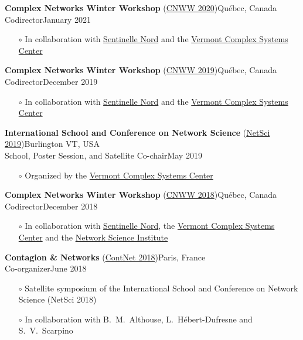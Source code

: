 \documentclass[11pt]{article}
\begin{document}
%
\parbox{\textwidth}{%
\textbf{Complex Networks Winter Workshop} (\href{https://sentinellenord.ulaval.ca/en/formation/ecoles-doctorales-internationales/ecole-internationale-sur-les-reseaux-complexes}{CNWW 2020})\hfill Qu\'ebec, Canada\\
Codirector\hfill January 2021
\begin{itemize}[leftmargin=1.5em]\small
  \item[$\circ$] In collaboration with \href{http://sentinellenord.ulaval.ca/}{Sentinelle Nord} and the \href{https://vermontcomplexsystems.org/}{Vermont Complex Systems Center}
\end{itemize}}
%
\parbox{\textwidth}{%
\textbf{Complex Networks Winter Workshop} (\href{https://sentinellenord.ulaval.ca/en/cnww-2019}{CNWW 2019})\hfill Qu\'ebec, Canada\\
Codirector\hfill December 2019
\begin{itemize}[leftmargin=1.5em]\small
  \item[$\circ$] In collaboration with \href{http://sentinellenord.ulaval.ca/}{Sentinelle Nord} and the \href{https://vermontcomplexsystems.org/}{Vermont Complex Systems Center}
\end{itemize}}
%
\parbox{\textwidth}{%
\textbf{International School and Conference on Network Science} (\href{http://vermontcomplexsystems.org/events/netsci/}{NetSci 2019})\hfill Burlington VT, USA\\
School, Poster Session, and Satellite Co-chair\hfill May 2019
\begin{itemize}[leftmargin=1.5em]\small
  \item[$\circ$] Organized by the \href{https://vermontcomplexsystems.org/}{Vermont Complex Systems Center}
\end{itemize}}
%
\parbox{\textwidth}{%
\textbf{Complex Networks Winter Workshop} (\href{https://sentinellenord.ulaval.ca/en/complex-networks-workshop-2018}{CNWW 2018})\hfill Qu\'ebec, Canada\\
Codirector\hfill December 2018
\begin{itemize}[leftmargin=1.5em]\small
  \item[$\circ$] In collaboration with \href{http://sentinellenord.ulaval.ca/}{Sentinelle Nord}, the \href{https://vermontcomplexsystems.org/}{Vermont Complex Systems Center} and the \href{https://www.networkscienceinstitute.org/}{Network Science Institute}
\end{itemize}}
%
\parbox{\textwidth}{%
\textbf{Contagion \& Networks} (\href{http://networkscontagion.github.io/}{ContNet 2018})\hfill Paris, France\\
Co-organizer\hfill June 2018
\begin{itemize}[leftmargin=1.5em]\small
  \item[$\circ$] Satellite symposium of the International School and Conference on Network Science (NetSci 2018)
  \item[$\circ$] In collaboration with B.~M.~Althouse, L.~H\'ebert-Dufresne and S.~V.~Scarpino
\end{itemize}}
\end{document}
